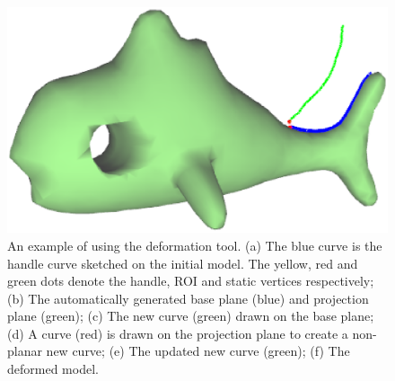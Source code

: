 \begin{figure} [htbp]
{    \begin{minipage}[b]{0.3\textwidth}
      \centering
      \includegraphics[scale=0.15]{figs/f3.fish-deform-5.eps}
    \end{minipage}}
  \caption{An example of using the deformation tool. (a) The blue curve is the handle curve sketched on the initial model. The yellow, red and green dots denote the handle, ROI and static vertices respectively; (b) The automatically generated base plane (blue) and projection plane (green); (c) The new curve (green) drawn on the base plane; (d) A curve (red) is drawn on the projection plane to create a non-planar new curve; (e) The updated new curve (green); (f) The deformed model.}
  \label{fig:deform} %
\end{figure}

